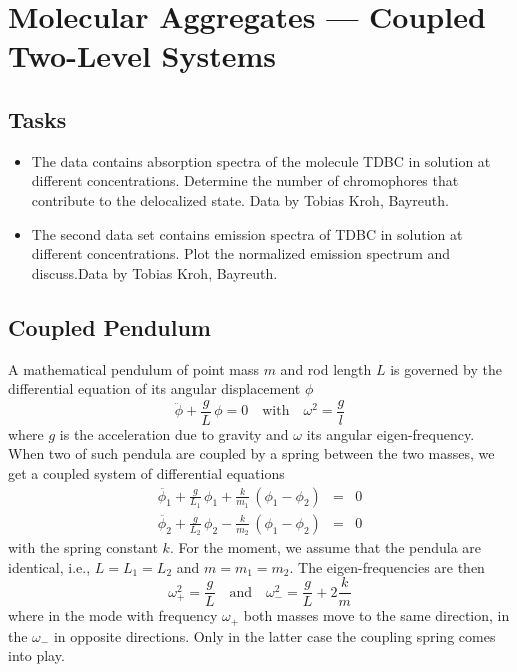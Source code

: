 \renewcommand{\lastmod}{April 27, 2020}


\chapter{Molecular Aggregates --- Coupled Two-Level Systems}



\section{Tasks}

\begin{itemize}
\item The data contains absorption spectra of the molecule TDBC in solution at different concentrations. Determine the number of chromophores that contribute to the delocalized state. Data by Tobias Kroh, Bayreuth.

\item The second data set contains emission spectra of TDBC in solution at different concentrations. Plot the normalized emission spectrum and discuss.Data by Tobias Kroh, Bayreuth.
\end{itemize}






\section{Coupled Pendulum}

A mathematical pendulum of point mass $m$ and rod length $L$ is governed by the differential equation of its angular displacement $\phi$
\[
 \ddot{\phi} + \frac{g}{L} \, \phi = 0 \quad \text{with} \quad \omega^2 = \frac{g}{l}
\]
where $g$ is the acceleration due to gravity and $\omega$ its angular eigen-frequency. When two of such pendula are coupled by a spring between the two masses, we get a coupled system of differential equations
\begin{eqnarray*}
 \ddot{\phi_1} + \frac{g}{L_1} \, \phi_1  + \frac{k}{m_1} \, \left( \phi_1  - \phi_2 \right)  & = &  0  \\
 \ddot{\phi_2} + \frac{g}{L_2} \, \phi_2  - \frac{k}{m_2} \, \left( \phi_1  - \phi_2 \right)  & = &  0  
\end{eqnarray*}
with the spring constant $k$.  For the moment, we assume that the pendula are identical, i.e., $L = L_1 = L_2$ and $m = m_1 =m_2$. The eigen-frequencies are then
\[
 \omega_{+}^2 = \frac{g}{L} \quad \text{and} \quad 
  \omega_{-}^2 = \frac{g}{L}  + 2 \frac{k}{m}
\]
where in the mode with frequency $\omega_{+}$ both masses move to the same direction, in the $\omega_{-}$ in opposite directions. Only in the latter case the coupling spring comes into play.

